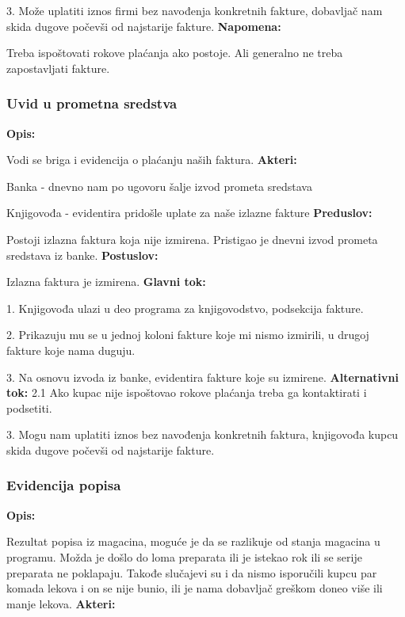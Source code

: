 3. Može uplatiti iznos firmi bez navođenja konkretnih fakture, dobavljač nam skida dugove počevši od najstarije fakture.
\newline
\textbf{Napomena:}

Treba ispoštovati rokove plaćanja ako postoje. Ali generalno ne treba zapostavljati fakture.

\subsubsection{Uvid u prometna sredstva}

\textbf{Opis:}

Vodi se briga i evidencija o plaćanju naših faktura.
\newline
\textbf{Akteri:}

Banka - dnevno nam po ugovoru šalje izvod prometa sredstava

Knjigovođa - evidentira pridošle uplate za naše izlazne fakture
\newline
\textbf{Preduslov:}

Postoji izlazna faktura koja nije izmirena.
Pristigao je dnevni izvod prometa sredstava iz banke.
\newline
\textbf{Postuslov:}

Izlazna faktura je izmirena.
\newline
\textbf{Glavni tok:}

1. Knjigovođa ulazi u deo programa za knjigovodstvo, podsekcija fakture.

2. Prikazuju mu se u jednoj koloni fakture koje mi nismo izmirili, u drugoj fakture koje nama duguju.

3. Na osnovu izvoda iz banke, evidentira fakture koje su izmirene.
\newline
\textbf{Alternativni tok:}
2.1 Ako kupac nije ispoštovao rokove plaćanja treba ga kontaktirati i podsetiti.

3. Mogu nam uplatiti iznos bez navođenja konkretnih faktura, knjigovođa kupcu skida dugove počevši od najstarije fakture.

\subsubsection{Evidencija popisa}

\textbf{Opis:}

Rezultat popisa iz magacina, moguće je da se razlikuje od stanja magacina u programu. Možda je došlo do loma preparata ili je istekao rok ili se serije preparata ne poklapaju. Takođe slučajevi su i da nismo isporučili kupcu par komada lekova i on se nije bunio, ili je nama dobavljač greškom doneo više ili manje lekova.
\newline
\textbf{Akteri:}

